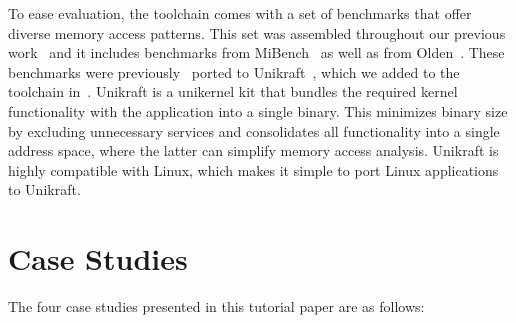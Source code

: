 \documentclass[manuscript,screen]{acmart}
\begin{document}
To ease evaluation, the toolchain comes with a set of benchmarks that offer diverse memory access patterns. This set was assembled throughout our previous work~\cite{hakert:2020:base, hakert:2020:softwear, hakert:2022, hoelscher:2023} and it includes benchmarks from MiBench~\cite{guthaus:2001} as well as from Olden~\cite{rogers:1995}. These benchmarks were previously~\cite{hoelscher:2023} ported to Unikraft~\cite{kuenzer:2021}, which we added to the toolchain in~\cite{hakert:2020:split}. Unikraft is a unikernel kit that bundles the required kernel functionality with the application into a single binary. This minimizes binary size by excluding unnecessary services and consolidates all functionality into a single address space, where the latter can simplify memory access analysis. Unikraft is highly compatible with Linux, which makes it simple to port Linux applications to Unikraft.

































\section{Case Studies}
The four case studies presented in this tutorial paper are as follows: 
\end{document}
